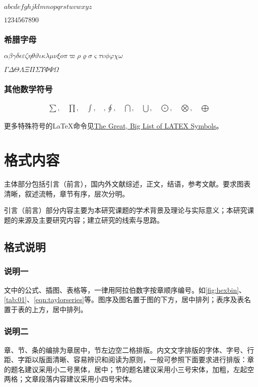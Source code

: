 $abcdefghjklmnopqrstuvwxyz$

$1234567890$

\subsubsection{希腊字母}
$\alpha\beta\gamma\delta\epsilon\varepsilon\zeta\eta\theta\vartheta\iota\kappa\lambda\mu\nu\xi o\pi\varpi\rho\varrho\sigma\varsigma\tau\upsilon\phi\varphi\chi\omega$

$\Gamma\Delta\Theta\Lambda\Xi\Pi\Sigma\Upsilon\Phi\Psi\Omega$

\subsubsection{其他数学符号}
\begin{align*}
    \sum, \quad \prod, \quad \int, \quad, \oint, \quad \bigcap, \quad \bigcup, \quad \bigodot, \quad \bigotimes, \quad \bigoplus
\end{align*}

更多特殊符号的\LaTeX{}命令见\href{https://mirrors.ustc.edu.cn/CTAN/info/symbols/comprehensive/symbols-a4.pdf}{The Great, Big List of LATEX Symbols}。

    


\section{格式内容}

主体部分包括引言（前言），国内外文献综述，正文，结语，参考文献。要求图表清晰，叙述流畅，章节有序，层次分明。

引言（前言）部分内容主要为本研究课题的学术背景及理论与实际意义；本研究课题的来源及主要研究内容；建立研究的线索与思路。

\subsection{格式说明}

\subsubsection{说明一}

文中的公式、插图、表格等，一律用阿拉伯数字按章顺序编号。如\ref{fig:hexbin}、    \ref{tab:01}、\ref{eqn:taylorseries}等。图序及图名置于图的下方，居中排列；表序及表名置于表的上方，居中排列。

\subsubsection{说明二}

章、节、条的编排为章居中，节左边空二格排版。内文文字排版的字体、字号、行距、字距以版面清晰、容易辨识和阅读为原则，一般可参照下面要求进行排版：章的题名建议采用小二号黑体，居中；节的题名建议采用小三号宋体，加粗，左起空两格；文章段落内容建议采用小四号宋体。
